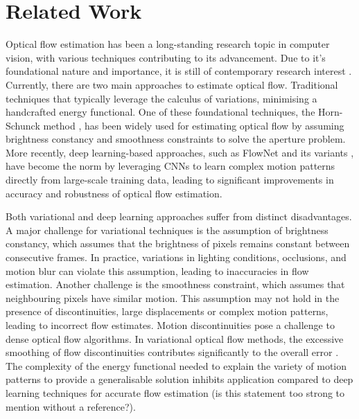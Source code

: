\section{Related Work}\label{sec:related}

\IEEEPARstart{}{} Optical flow estimation has been a long-standing research topic in computer vision, with various techniques contributing to its advancement. Due to it's foundational nature and importance, it is still of contemporary research interest \cite{xu2022gmflow,teed2020raft,shi2023flowformer++, saxena2024surprising}. Currently, there are two main approaches to estimate optical flow. Traditional techniques that typically leverage the calculus of variations, minimising a handcrafted energy functional. One of these foundational techniques, the Horn-Schunck method \cite{horn1981determining}, has been widely used for estimating optical flow by assuming brightness constancy and smoothness constraints to solve the aperture problem. More recently, deep learning-based approaches, such as FlowNet and its variants \cite{dosovitskiy2015flownet, ilg2017flownet, hui2018liteflownet, sun2018pwc}, have become the norm by leveraging CNNs to learn complex motion patterns directly from large-scale training data, leading to significant improvements in accuracy and robustness of optical flow estimation.

\IEEEPARstart{}{} Both variational and deep learning approaches suffer from distinct disadvantages. A major challenge for variational techniques is the assumption of brightness constancy, which assumes that the brightness of pixels remains constant between consecutive frames. In practice, variations in lighting conditions, occlusions, and motion blur can violate this assumption, leading to inaccuracies in flow estimation. Another challenge is the smoothness constraint, which assumes that neighbouring pixels have similar motion. This assumption may not hold in the presence of discontinuities, large displacements or complex motion patterns, leading to incorrect flow estimates. Motion discontinuities pose a challenge to dense optical flow algorithms. In variational optical flow methods, the excessive smoothing of flow discontinuities contributes significantly to the overall error \cite{amiaz2006piecewise}. The complexity of the energy functional needed to explain the variety of motion patterns to provide a generalisable solution inhibits application compared to deep learning techniques for accurate flow estimation \color{red}(is this statement too strong to mention without a reference?)\color{black}.

